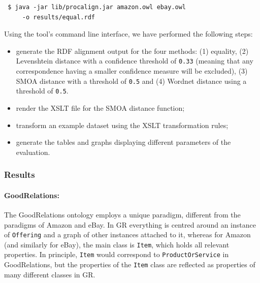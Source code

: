 \begin{center}
\lstset{frame=single, basicstyle=\small}
\lstset{caption=Executing the alignment tool on a pair of ontologies, label=listing_cli}
\lstset{language=bash}
\lstset{captionpos=b}
\begin{lstlisting}
 $ java -jar lib/procalign.jar amazon.owl ebay.owl 
     -o results/equal.rdf
\end{lstlisting}
\end{center}
 
Using the tool's command line interface, we have performed the following steps:
\begin{itemize}
\item generate the RDF alignment output for the four methods: (1) equality, (2) Levenshtein distance with a confidence threshold of \texttt{0.33} (meaning that any correspondence having a smaller confidence measure will be excluded), (3) SMOA distance with a threshold of \texttt{0.5} and (4) Wordnet distance using a threshold of \texttt{0.5}.
\item render the XSLT file for the SMOA distance function;
\item transform an example dataset using the XSLT transformation rules;
\item generate the tables and graphs displaying different parameters of the evaluation.
\end{itemize}

\subsubsection{Results}
\label{results}

\paragraph{GoodRelations:}
\label{gr}
 
The GoodRelations ontology employs a unique paradigm, different from the paradigms of Amazon and eBay. In GR everything is centred around an instance of \texttt{Offering} and a graph of other instances attached to it, whereas for Amazon (and similarly for eBay), the main class is \texttt{Item}, which holds all relevant properties. In principle, \texttt{Item} would correspond to \texttt{ProductOrService} in GoodRelations, but the properties of the \texttt{Item} class are reflected as properties of many different classes in GR. 

